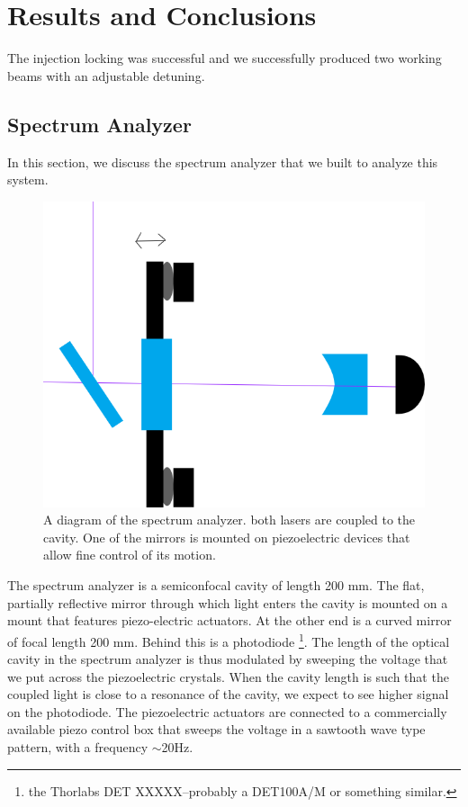 \chapter{Results and Conclusions}

The injection locking was successful and we successfully produced two working beams with an adjustable detuning. 

\section{Spectrum Analyzer}
In this section, we discuss the spectrum analyzer that we built to analyze this system. 

\begin{figure}
    \centerline{\includegraphics[totalheight=0.3\textheight ]{spectrumAnalyzer}}
    \caption[]{\label{fig:spectrumAnalyzer}
    A diagram of the spectrum analyzer. both lasers are coupled to the cavity. One of the mirrors is mounted on piezoelectric devices that allow fine control of its motion. 
}
\end{figure}

The spectrum analyzer is a semiconfocal cavity of length 200 mm. The flat, partially reflective mirror through which light enters the cavity is mounted on a mount that features piezo-electric actuators. At the other end is a curved mirror of focal length 200 mm. Behind this is a photodiode \footnote{the Thorlabs DET XXXXX--probably a DET100A/M or something similar.}.
The length of the optical cavity in the spectrum analyzer is thus modulated by sweeping the voltage that we put across the piezoelectric crystals. When the cavity length is such that the coupled light is close to a resonance of the cavity, we expect to see higher signal on the photodiode. 
The piezoelectric actuators are connected to a commercially available piezo control box that sweeps the voltage in a sawtooth wave type pattern, with a frequency $\sim$20Hz. 

